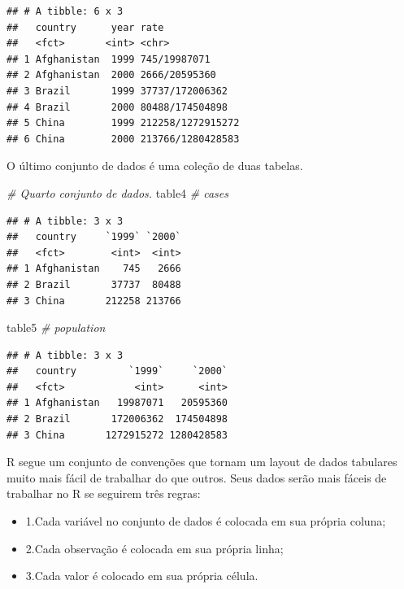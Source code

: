 \documentclass[]{book}
\newenvironment{Shaded}{\begin{snugshade}}{\end{snugshade}}
\newcommand{\CommentTok}[1]{\textcolor[rgb]{0.56,0.35,0.01}{\textit{#1}}}
\newcommand{\NormalTok}[1]{#1}
\providecommand{\tightlist}{%
  \setlength{\itemsep}{0pt}\setlength{\parskip}{0pt}}
\begin{document}
\begin{verbatim}
## # A tibble: 6 x 3
##   country      year rate             
##   <fct>       <int> <chr>            
## 1 Afghanistan  1999 745/19987071     
## 2 Afghanistan  2000 2666/20595360    
## 3 Brazil       1999 37737/172006362  
## 4 Brazil       2000 80488/174504898  
## 5 China        1999 212258/1272915272
## 6 China        2000 213766/1280428583
\end{verbatim}

O último conjunto de dados é uma coleção de duas tabelas.

\begin{Shaded}
\begin{Highlighting}[]
\CommentTok{# Quarto conjunto de dados.}
\NormalTok{table4 }\CommentTok{# cases}
\end{Highlighting}
\end{Shaded}

\begin{verbatim}
## # A tibble: 3 x 3
##   country     `1999` `2000`
##   <fct>        <int>  <int>
## 1 Afghanistan    745   2666
## 2 Brazil       37737  80488
## 3 China       212258 213766
\end{verbatim}

\begin{Shaded}
\begin{Highlighting}[]
\NormalTok{table5 }\CommentTok{# population}
\end{Highlighting}
\end{Shaded}

\begin{verbatim}
## # A tibble: 3 x 3
##   country         `1999`     `2000`
##   <fct>            <int>      <int>
## 1 Afghanistan   19987071   20595360
## 2 Brazil       172006362  174504898
## 3 China       1272915272 1280428583
\end{verbatim}

R segue um conjunto de convenções que tornam um layout de dados tabulares muito mais fácil de trabalhar do que outros. Seus dados serão mais fáceis de trabalhar no R se seguirem três regras:

\begin{itemize}
\tightlist
\item
  1.Cada variável no conjunto de dados é colocada em sua própria coluna;
\item
  2.Cada observação é colocada em sua própria linha;
\item
  3.Cada valor é colocado em sua própria célula.
\end{itemize}
\end{document}
